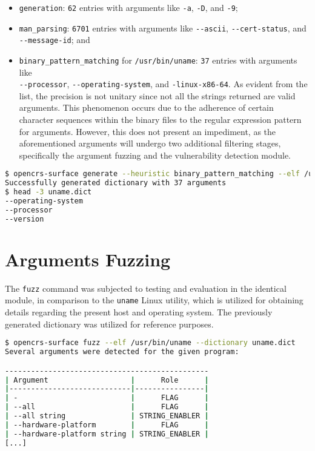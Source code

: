 \documentclass[../main.tex]{subfiles}
\begin{document}
\begin{itemize}
  \tightlist
  \item
        \texttt{generation}: \texttt{62} entries with arguments like
        \texttt{-a}, \texttt{-D}, and \texttt{-9};
  \item
        \texttt{man\_parsing}: \texttt{6701} entries with arguments like
        \texttt{-\/-ascii}, \texttt{-\/-cert-status}, and \\
        \texttt{-\/-message-id}; and
  \item
        \texttt{binary\_pattern\_matching} for \texttt{/usr/bin/uname}:
        \texttt{37} entries with arguments like \\ \texttt{-\/-processor}, \texttt{-\/-operating-system}, and \texttt{-linux-x86-64}. As evident from the
        list, the precision is not unitary since not all the strings
        returned are valid arguments. This phenomenon occurs due to the
        adherence of certain character sequences within the binary files to
        the regular expression pattern for arguments. However, this does not
        present an impediment, as the aforementioned arguments will undergo
        two additional filtering stages, specifically the argument fuzzing and
        the vulnerability detection module.
\end{itemize}

\begin{lstlisting}[captionpos=b,basicstyle=\tiny,language=Bash, caption=Example of Generating a Dictionary with Arguments]
$ opencrs-surface generate --heuristic binary_pattern_matching --elf /usr/bin/uname --output uname.dict
Successfully generated dictionary with 37 arguments
$ head -3 uname.dict
--operating-system
--processor
--version
\end{lstlisting}

\hypertarget{arguments-fuzzing}{%
  \section{Arguments Fuzzing}\label{arguments-fuzzing}}

The \texttt{fuzz} command was subjected to testing and evaluation in the
identical module, in comparison to the \texttt{uname} Linux utility, which is
utilized for obtaining details regarding the present host and operating system.
The previously generated dictionary was utilized for reference purposes.

\begin{lstlisting}[captionpos=b,basicstyle=\tiny,language=Bash, caption=Example of Fuzzing Arguments]
$ opencrs-surface fuzz --elf /usr/bin/uname --dictionary uname.dict
Several arguments were detected for the given program:

-----------------------------------------------
| Argument                   |      Role      |
|----------------------------|----------------|
| -                          |      FLAG      |
| --all                      |      FLAG      |
| --all string               | STRING_ENABLER |
| --hardware-platform        |      FLAG      |
| --hardware-platform string | STRING_ENABLER |
[...]
\end{lstlisting}
\end{document}
